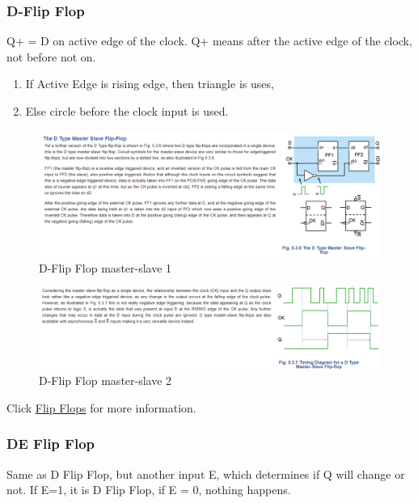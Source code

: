 \documentclass[11pt, a4paper]{article}
\begin{document}
\subsubsection{D-Flip Flop}
Q+ = D on active edge of the clock.
Q+ means after the active edge of the clock, not before not on.
\begin{enumerate}
    \item If Active Edge is rising edge, then triangle is uses,
    \item Else circle before the clock input is used.
\end{enumerate}
\begin{figure}[H]
    \centering
    \includegraphics[width=\textwidth]{Pictures/D-FlipFlop.png}
    \caption{D-Flip Flop master-slave 1}
\end{figure}
\begin{figure}[H]
    \centering
    \includegraphics[width=\textwidth]{Pictures/D-FlipFlop2.png}
    \caption{D-Flip Flop master-slave 2}
\end{figure}
Click \href{https://learnabout-electronics.org/Digital/dig53.php}{Flip Flops} for more information.

\subsubsection{DE Flip Flop}
Same as D Flip Flop, but another input E, which determines if Q will change or not. If E=1, it is D Flip Flop, if E = 0, nothing happens.
\end{document}
